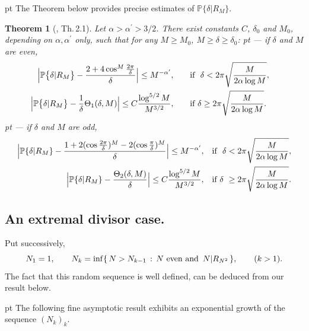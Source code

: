 \documentclass[11pt,draft,reqno]{amsart}
\newtheorem{theorem}{Theorem}[section]
\theoremstyle{definition}
\theoremstyle{remarks}
\numberwithin{equation}{section}
\def \a{{\alpha}}
\def \d{{\delta}}
\def\P{{\mathcal P}}
\def\P{{\mathbb P}}
\begin{document}
  pt  The  Theorem below provides precise estimates of $\P\big\{ \d | R_{M}\big\}$.
\begin{theorem}[\cite{W7}, Th.\,2.1]\label{radem.t2.1}
 Let $\a >\a^\prime>3/2$. There exist constants
$C$, $\d_0$  and  
$M_0$, depending on $\a,\a^{\prime}$ only, such that for any $M\ge M_0$, $M\ge \d\ge \d_0$:
 pt  
--- if $\d$ and $M$ are even,
\begin{eqnarray} \Big|\P\big\{ \d | R_{M}\big\} -{ 2 + 4 \cos^M {2\pi  \over \d}  \over \d}\Big| \le  M^{- \a^\prime },& \qquad 
\hbox{if} \ \  \d <
2\pi 
\sqrt{M\over {2\a\log M}} ,\cr
 \Big|  \P\big\{ \d | R_{M}\big\}-  {1\over \d}\Theta_1(\d,M)  \Big|\le C  {
\log^{5/2} M 
\over M^{3/2}},& \qquad \hbox{if} \ \d \ge  2\pi  \sqrt{M\over {2\a\log M}}. 
\end{eqnarray}
 pt   
--- if $\d$ and $M$ are odd,
\begin{eqnarray}  \Big|\P\{ \d|R_M\}-{1+ 2 (\cos {2\pi  \over \d})^M-2(\cos{\pi  \over \d})^M \over \d}\Big| 
\le M^{- \a^\prime }, & &  \hbox{if} \ \ \d <
2\pi 
\sqrt{M\over {2\a\log M}} ,\cr
  \Big|\P\{ \d|R_M\} - { \Theta_2(\d,M) \over \d}\Big|\le C   {\log^{5/2} M \over M^{3/2}},  & & \hbox{if} \ \d \ \ge  2\pi  \sqrt{M\over {2\a\log
M}}.
\end{eqnarray} 
\end{theorem}

\bigskip\par 
\subsection{An extremal divisor case.} Put  successively, 
$$ N_1 =1, \qquad N_k =\inf\{\, N>N_{k-1}  \, :\, N\   {\rm even \  and} \  \, N | R_{N^2}\, \},\qquad(k>1). $$ 
The fact that this random sequence  is well defined,  can be deduced from our result below. 

 pt The following fine asymptotic result    exhibits an exponential growth of the sequence
$(N_k)_k$. 
\end{document}
